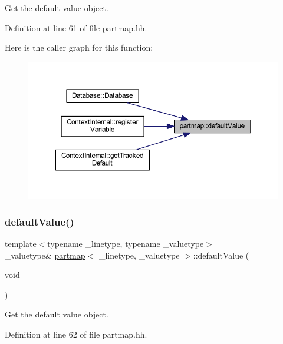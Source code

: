 Get the default value object. 



Definition at line 61 of file partmap.\+hh.

Here is the caller graph for this function\+:
\nopagebreak
\begin{figure}[H]
\begin{center}
\leavevmode
\includegraphics[width=350pt]{classpartmap_a54e9c1e59dda87a818b92c8c32819b91_icgraph}
\end{center}
\end{figure}
\mbox{\label{classpartmap_a8d90ac149dc375cb14c5126a64b240b8}} 
\subsubsection{\texorpdfstring{defaultValue()}{defaultValue()}\hspace{0.1cm}{\footnotesize\ttfamily [2/2]}}
{\footnotesize\ttfamily template$<$typename \+\_\+linetype, typename \+\_\+valuetype$>$ \\
\+\_\+valuetype\& \mbox{\hyperlink{classpartmap}{partmap}}$<$ \+\_\+linetype, \+\_\+valuetype $>$\+::default\+Value (\begin{DoxyParamCaption}\item[{void}]{ }\end{DoxyParamCaption})\hspace{0.3cm}{\ttfamily [inline]}}



Get the default value object. 



Definition at line 62 of file partmap.\+hh.

